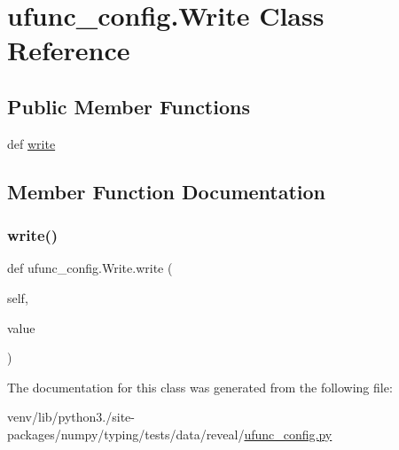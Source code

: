 \hypertarget{classufunc__config_1_1Write}{}\section{ufunc\+\_\+config.\+Write Class Reference}
\label{classufunc__config_1_1Write}
\subsection*{Public Member Functions}
\begin{DoxyCompactItemize}
\item 
def \hyperlink{classufunc__config_1_1Write_af02ce19225b54e027209bdfb8d7d6ba3}{write}
\end{DoxyCompactItemize}


\subsection{Member Function Documentation}
\mbox{\label{classufunc__config_1_1Write_af02ce19225b54e027209bdfb8d7d6ba3}} 
\subsubsection{\texorpdfstring{write()}{write()}}
{\footnotesize\ttfamily def ufunc\+\_\+config.\+Write.\+write (\begin{DoxyParamCaption}\item[{}]{self,  }\item[{}]{value }\end{DoxyParamCaption})}



The documentation for this class was generated from the following file\+:\begin{DoxyCompactItemize}
\item 
venv/lib/python3./site-\/packages/numpy/typing/tests/data/reveal/\hyperlink{reveal_2ufunc__config_8py}{ufunc\+\_\+config.\+py}\end{DoxyCompactItemize}
